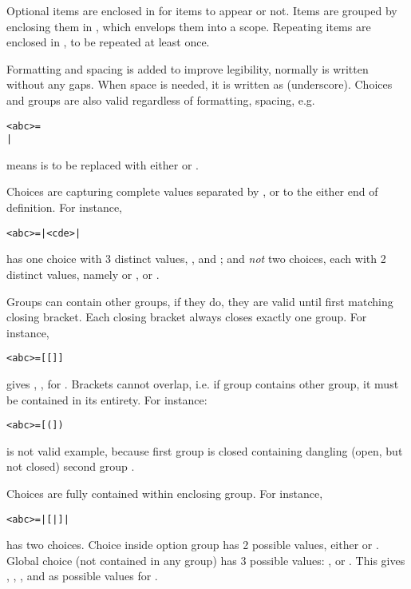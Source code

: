 Optional items are enclosed in \algfmt{[ ]} for items to appear or not. Items are
grouped by enclosing them in \algfmt{( )}, which envelops them into a scope.
Repeating items are enclosed in \algfmt{\{ \}}, to be repeated at least once.

\clearpage %

Formatting and spacing is added to improve legibility, normally  is
written without any gaps. When space is needed, it is written as \alg{\_}
(underscore). Choices and groups are also valid regardless of formatting,
spacing, e.g.
\begin{alltt}
<abc> = 
  | 
\end{alltt}
means  is to be replaced with either  or .

Choices are capturing complete values separated by \algfmt{|}, or to the either
end of definition. For instance,
\begin{alltt}
<abc> =  |  <cde>  | 
\end{alltt}
has one choice with 3 distinct values, ,  and
; and \emph{not} two choices, each with 2 distinct values, namely  or
,  or .

Groups can contain other groups, if they do, they are valid until first matching
closing bracket. Each closing bracket always closes exactly one group. For instance,
\begin{alltt}
<abc> =  [  [  ]  ] 
\end{alltt}
gives , ,  for .
Brackets cannot overlap, i.e. if group contains other group, it must be contained in
its entirety. For instance:
\begin{alltt}
<abc> =  [  (  ]  ) 
\end{alltt}
is not valid example, because first group \algfmt{[ ]} is closed containing
dangling (open, but not closed) second group \algfmt{( )}.

\clearpage %

Choices are fully contained within enclosing group. For instance,
\begin{alltt}
<abc> =  |  [  |  ]  | 
\end{alltt}
has two choices. Choice inside option group \algfmt{[ ]} has 2 possible values,
either  or . Global choice (not contained in any group) has 3 possible
values: , \algfmt{[}\algfmt{|}\algfmt{]} or .
This gives , , ,  and  as possible values for
.


